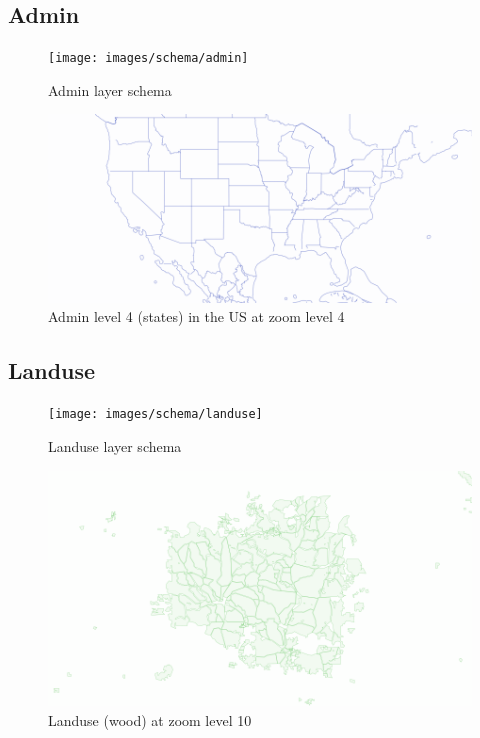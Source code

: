 \subsection{Admin}

\begin{figure}[H]
  \centering
  \texttt{[image: images/schema/admin]}
  \caption{Admin layer schema}
\end{figure}

\begin{figure}[H]
  \centering
  \includegraphics[width=1\textwidth]{images/schema/admin_example}
  \caption{Admin level 4 (states) in the US at zoom level 4}
\end{figure}

\subsection{Landuse}

\begin{figure}[H]
  \centering
  \texttt{[image: images/schema/landuse]}
  \caption{Landuse layer schema}
\end{figure}

\begin{figure}[H]
  \centering
  \includegraphics[width=1\textwidth]{images/schema/landuse_example}
  \caption{Landuse (wood) at zoom level 10}
\end{figure}
